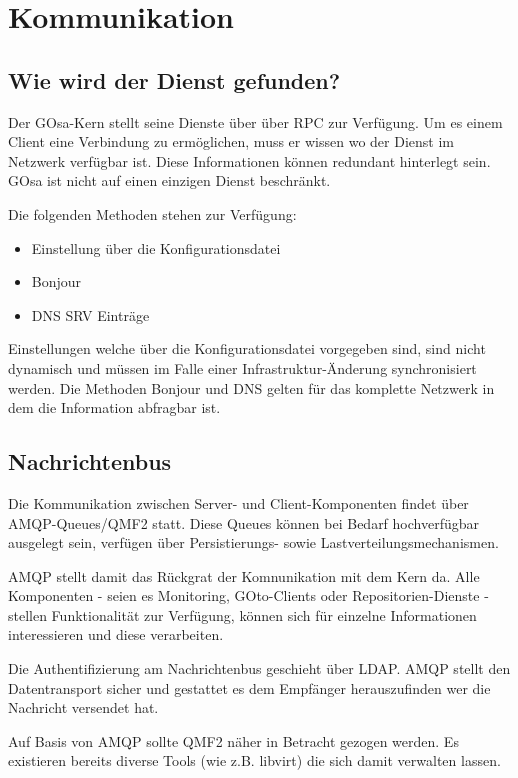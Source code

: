 \section{Kommunikation}

\subsection{Wie wird der Dienst gefunden?}

Der GOsa-Kern stellt seine Dienste über über RPC zur Verfügung. Um
es einem Client eine Verbindung zu ermöglichen, muss er wissen wo der Dienst
im Netzwerk verfügbar ist. Diese Informationen können redundant hinterlegt sein.
GOsa ist nicht auf einen einzigen Dienst beschränkt.

Die folgenden Methoden stehen zur Verfügung:

\begin{itemize}
\item Einstellung über die Konfigurationsdatei
\item Bonjour
\item DNS SRV Einträge
\end{itemize}

Einstellungen welche über die Konfigurationsdatei vorgegeben sind, sind nicht
dynamisch und müssen im Falle einer Infrastruktur-Änderung synchronisiert werden.
Die Methoden Bonjour und DNS gelten für das komplette Netzwerk in dem die Information
abfragbar ist.

\subsection{Nachrichtenbus}

Die Kommunikation zwischen Server- und Client-Komponenten findet über
AMQP-Queues/QMF2 statt. Diese Queues können bei Bedarf hochverfügbar ausgelegt
sein, verfügen über Persistierungs- sowie Lastverteilungsmechanismen.

AMQP stellt damit das Rückgrat der Komnunikation mit dem Kern da. Alle
Komponenten - seien es Monitoring, GOto-Clients oder Repositorien-Dienste -
stellen Funktionalität zur Verfügung, können sich für einzelne Informationen
interessieren und diese verarbeiten.

Die Authentifizierung am Nachrichtenbus geschieht über LDAP. AMQP stellt
den Datentransport sicher und gestattet es dem Empfänger herauszufinden
wer die Nachricht versendet hat.

Auf Basis von AMQP sollte QMF2 näher in Betracht gezogen werden. Es existieren
bereits diverse Tools (wie z.B. libvirt) die sich damit verwalten lassen.


